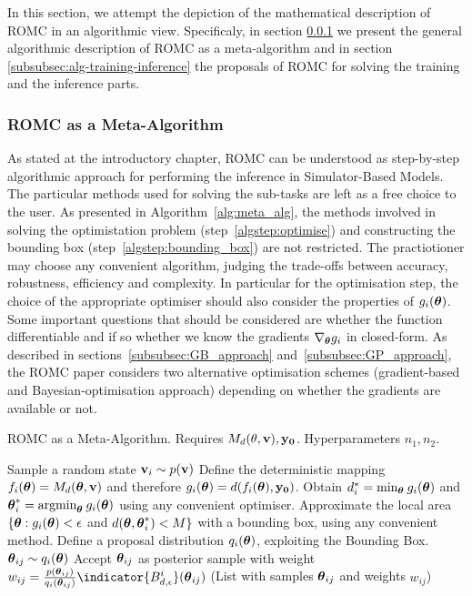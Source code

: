 In this section, we attempt the depiction of the mathematical
description of ROMC in an algorithmic view. Specificaly, in section
\ref{subsubsec:romc-meta-algorithm} we present the general algorithmic
description of ROMC as a meta-algorithm and in section
\ref{subsubsec:alg-training-inference} the proposals of ROMC for
solving the training and the inference parts.

\subsubsection{ROMC as a Meta-Algorithm}
\label{subsubsec:romc-meta-algorithm}

As stated at the introductory chapter, ROMC can be understood as
step-by-step algorithmic approach for performing the inference in
Simulator-Based Models. The particular methods used for solving the
sub-tasks are left as a free choice to the user. As presented in
Algorithm~\ref{alg:meta_alg}, the methods involved in solving the
optimistation problem (step~\ref{algstep:optimise}) and constructing
the bounding box (step~\ref{algstep:bounding_box}) are not
restricted. The practiotioner may choose any convenient algorithm,
judging the trade-offs between accuracy, robustness, efficiency and
complexity. In particular for the optimisation step, the choice of the
appropriate optimiser should also consider the properties of
$g_i(\boldsymbol{\theta})$. Some important questions that should be considered are
whether the function differentiable and if so whether we know the
gradients $\nabla_{\boldsymbol{\theta}} g_i $ in closed-form. As described in
sections~\ref{subsubsec:GB_approach} and~\ref{subsubsec:GP_approach},
the ROMC paper considers two alternative optimisation schemes
(gradient-based and Bayesian-optimisation approach) depending on whether
the gradients are available or not.

\begin{algorithm}[t]
	\caption{ROMC as a Meta-Algorithm. Requires $M_d(\theta, \mathbf{v}), \mathbf{y_0}$. Hyperparameters $n_1,n_2$.}\label{alg:meta_alg}
	\begin{algorithmic}[1]
    \State Sample a random state $\mathbf{v}_i \sim p(\mathbf{v})$
		\State Define the deterministic mapping $f_i(\boldsymbol{\theta}) = M_d(\boldsymbol{\theta}, \mathbf{v})$ and therefore $g_i(\boldsymbol{\theta}) = d(f_i(\boldsymbol{\theta}), \mathbf{y_0})$.
    \State Obtain $d_i^* = \text{min}_{\boldsymbol{\theta}} \: g_i(\boldsymbol{\theta})$ and $\boldsymbol{\theta}_i^* = \text{argmin}_{\boldsymbol{\theta}}\: g_i(\boldsymbol{\theta})$ using any convenient optimiser. \label{algstep:optimise}
    \State Approximate the local area $\{ \boldsymbol{\theta} : g_i(\boldsymbol{\theta}) < \epsilon$ and $d(\boldsymbol{\theta}, \boldsymbol{\theta}_i^*) < M \}$ with a bounding box, using any convenient method. \label{algstep:bounding_box}
		\State Define a proposal distribution $q_i(\boldsymbol{\theta})$, exploiting the Bounding Box.
			\State $\boldsymbol{\theta}_{ij} \sim q_i(\boldsymbol{\theta})$
			\State Accept $\boldsymbol{\theta}_{ij}$ as posterior sample with weight $w_{ij} = \frac{p(\thetabij)}{q_i(\thetabij)} \indicator{\regioni} (\thetabij)$
			\EndFor
      \EndFor
     \Return(List with samples $\boldsymbol{\theta}_{ij}$ and weights $w_{ij}$) 
	\end{algorithmic}
\end{algorithm}


